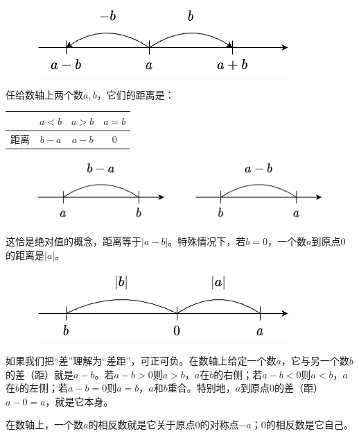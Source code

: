 \documentclass[b5paper]{ctexart}
\begin{document}
\begin{figure}[htbp]
 \centering
 \includegraphics[scale=0.45]{img/translate}
\end{figure}

任给数轴上两个数$a, b$，它们的距离是：

\begin{center}
  \begin{tabular}{c|c|c|c}
      & $a < b$ & $a > b$ & $a = b$ \\
  \hline
  距离 & $b - a$ & $a - b$ & $0$
  \end{tabular}
\end{center}

\begin{figure}[htbp]
 \centering
 \includegraphics[scale=0.4]{img/distance}
\end{figure}

这恰是绝对值的概念，距离等于$|a - b|$。特殊情况下，若$b = 0$，一个数$a$到原点0的距离是$|a|$。

\begin{figure}[htbp]
 \centering
 \includegraphics[scale=0.4]{img/abs}
\end{figure}

如果我们把“差”理解为“差距”，可正可负。在数轴上给定一个数$a$，它与另一个数$b$的差（距）就是$a - b$。若$a - b > 0$则$a > b$，$a$在$b$的右侧；若$a - b < 0$则$a < b$，$a$在$b$的左侧；若$a - b = 0$则$a = b$，$a$和$b$重合。特别地，$a$到原点0的差（距）$a - 0 = a$，就是它本身。

在数轴上，一个数$a$的相反数就是它关于原点0的对称点$-a$；0的相反数是它自己。

\begin{center}
\end{center}
\end{document}
